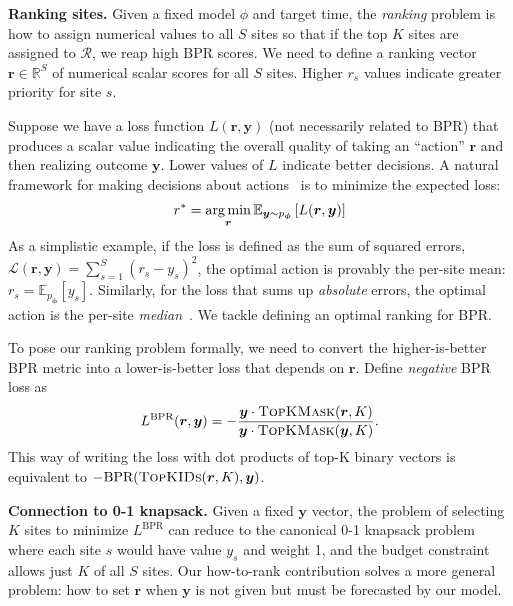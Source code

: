 \textbf{Ranking sites.}
Given a fixed model $\phi$ and target time, the \emph{ranking} problem is how to assign numerical values to all $S$ sites so that if the top $K$ sites are assigned to $\mathcal{R}$, we reap high BPR scores. We need to define a ranking vector $\bm{r} \in \mathbb{R}^S$ of numerical scalar scores for all $S$ sites. Higher $r_s$ values indicate greater priority for site $s$. 


Suppose we have a loss function $L(\bm{r}, \bm{y})$ (not necessarily related to BPR) that 
produces a scalar value 
indicating the overall quality of taking an ``action'' $\bm{r}$ and then realizing outcome $\bm{y}$.
Lower values of $L$ indicate better decisions.
A natural framework for making decisions about actions~\citep{murphy2022Sec5_1DecisionTheory} is to minimize the expected loss:
\begin{align}
    r^* = \operatorname*{arg\,min}_{\bm{r}} \mathbb{E}_{\bm{y} \sim p_{\bm{\phi}}} \left[ L( \bm{r}, \bm{y} )
    \right]
\end{align}
As a simplistic example, if the loss is defined as the sum of squared errors, $\mathcal{L}( \bm{r}, \bm{y}) = \sum_{s=1}^S (r_s - y_s)^2$, the optimal action is provably the per-site mean: $r_s = \mathbb{E}_{p_{\bm{\phi}}}[ y_s ]$. Similarly, for the loss that sums up \emph{absolute} errors, the optimal action is the per-site \emph{median}~\citep{schwertman1990MedianProof,proofMedianMinimizesMAE}. We tackle defining an optimal ranking for BPR.

To pose our ranking problem formally, we need to convert the higher-is-better BPR metric into a lower-is-better loss that depends on $\bm{r}$. Define \emph{negative} BPR loss as
\begin{align}
   L^{\text{BPR}}(\bm{r}, \bm{y})
    =  - \frac{
    \bm{y} \cdot \textsc{TopKMask}(\bm{r}, K)
    }{
    \bm{y} \cdot \textsc{TopKMask}(\bm{y}, K)    
    }.
    \label{eq:loss_bpr_how_to_rank}
\end{align}
This way of writing the loss with dot products of top-K binary vectors is equivalent to $-\text{BPR}( \textsc{TopKIDs}(\bm{r},K), \bm{y} )$.

\textbf{Connection to 0-1 knapsack.} Given a fixed $\bm{y}$ vector, the problem of selecting $K$ sites to minimize $L^{\text{BPR}}$ can reduce to the canonical 0-1 knapsack problem \cite{dantzigDiscreteVariableExtremumProblems1957} where each site $s$ would have value $y_s$ and weight 1, and the budget constraint allows just $K$ of all $S$ sites. Our how-to-rank contribution solves a more general problem: how to set $\bm{r}$ when $\bm{y}$ is not given but must be forecasted by our model.

